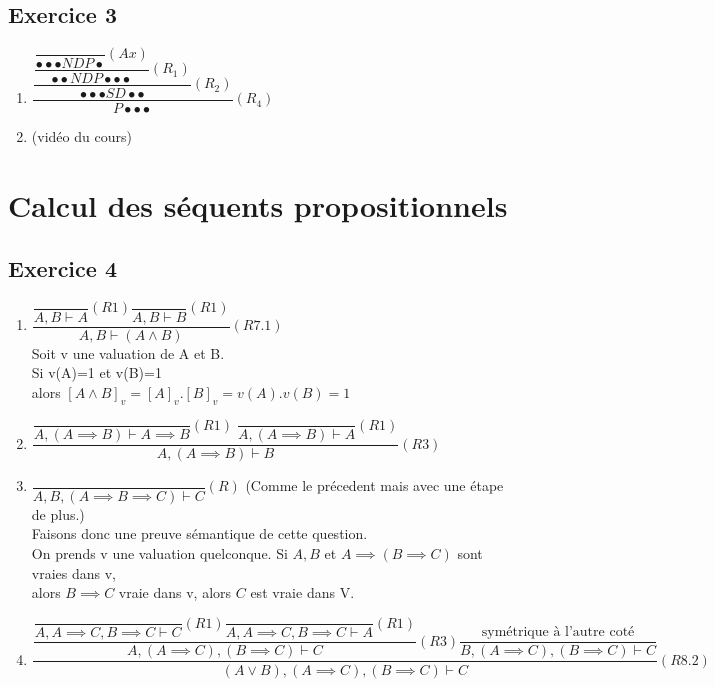 \documentclass[a4paper]{article}
\newcommand\p{\bullet}
\begin{document}
\subsection*{Exercice 3}
\begin{enumerate}
  \item $\dfrac{\dfrac{\dfrac{\dfrac{}{\p\p\p NDP \p}(Ax)}{\p\p NDP \p\p\p}(R_{1})}{\p\p\p SD \p\p}(R_{2})}{P\p\p\p}(R_{4})$\\
  \item (vidéo du cours)\\
\end{enumerate}\newpage
\section{Calcul des séquents propositionnels}
\vspace{5mm}
\subsection*{Exercice 4}
\begin{enumerate}
  \item $\dfrac{\dfrac{}{A, B \vdash A}(R1) \dfrac{}{A,B \vdash B}(R1)}{A,B\vdash (A\land B)}(R7.1)$\\
    Soit v une valuation de A et B. \\Si v(A)=1 et v(B)=1 \\
    alors $[A\land B]_v=[A]_v.[B]_v=v(A).v(B)=1$\\
  \item $\dfrac{\dfrac{}{A,(A\implies B)\vdash A \implies B}(R1) \; \dfrac{}{A, (A\implies B) \vdash A}(R1)}{A,(A\implies B) \vdash B}(R3)$\\
  \item $\dfrac{}{A,B,(A\implies B \implies C) \vdash C}(R)$ (Comme le précedent mais avec une étape de plus.)\\
    Faisons donc une preuve sémantique de cette question.\\
    On prends v une valuation quelconque.
    Si $A,B$ et $A\implies( B\implies C)$ sont vraies dans v,\\
    alors $B\implies C$ vraie dans v,
    alors $C$ est vraie dans V.\\
  \item $\dfrac{\dfrac{\dfrac{}{A,A\implies C, B\implies C \vdash C}(R1) \dfrac{}{A,A\implies C, B \implies C \vdash A}(R1)}{A,(A\implies C), (B\implies C)\vdash C}(R3)\dfrac{\text{symétrique à l'autre coté}}{B,(A\implies C), (B\implies C)\vdash C}}{(A\lor B), (A \implies C),(B\implies C) \vdash C}(R8.2)$\\
\end{enumerate}
\end{document}
